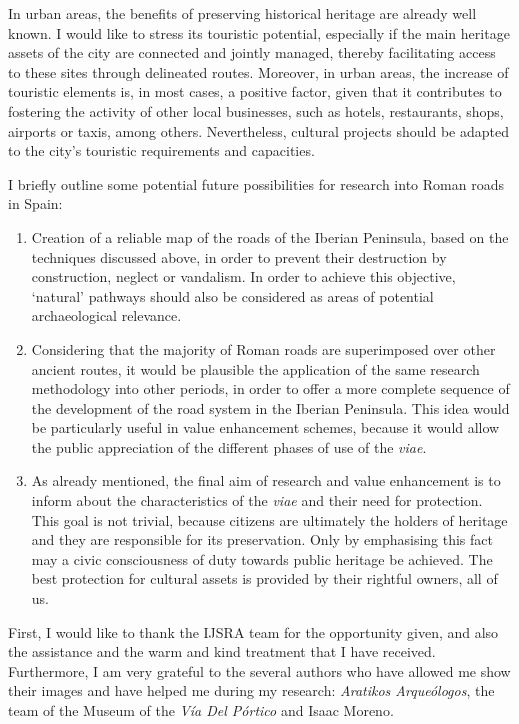 In urban areas, the benefits of preserving historical heritage are already well known. I would like to stress its touristic potential, especially if the main heritage assets of the city are connected and jointly managed, thereby facilitating access to these sites through delineated routes. Moreover, in urban areas, the increase of touristic elements is, in most cases, a positive factor, given that it contributes to fostering the activity of other local businesses, such as hotels, restaurants, shops, airports or taxis, among others. Nevertheless, cultural projects should be adapted to the city’s touristic requirements and capacities.


I  briefly outline some potential future possibilities for research into Roman roads in Spain:

\begin{enumerate}
	\item Creation of a reliable map of the roads of the Iberian Peninsula, based on the techniques discussed above, in order to prevent their destruction by construction, neglect or vandalism. In order to achieve this objective, ‘natural’ pathways should also be considered as areas of potential archaeological relevance.
	\item Considering that the majority of Roman roads are superimposed over other ancient routes, it would be plausible the application of the same research methodology into other periods, in order to offer a more complete sequence of the development of the road system in the Iberian Peninsula. This idea would be particularly useful in value enhancement schemes, because it would allow the public appreciation of the different phases of use of the \textit{viae}.
	\item As already mentioned, the final aim of research and value enhancement is to inform about the characteristics of the \textit{viae} and their need for protection. This goal is not trivial, because citizens are ultimately the holders of heritage and they are responsible for its preservation. Only by emphasising this fact may a civic consciousness of duty towards public heritage be achieved. The best protection for cultural assets is provided by their rightful owners, all of us.
\end{enumerate}
\myseparator
First, I would like to thank the IJSRA team for the opportunity given, and also the assistance and the warm and kind treatment that I have received. Furthermore, I am very grateful to the several authors who have allowed me show their images and have helped me during my research: \textit{Aratikos Arqueólogos}, the team of the Museum of the \textit{Vía Del Pórtico} and Isaac Moreno.



